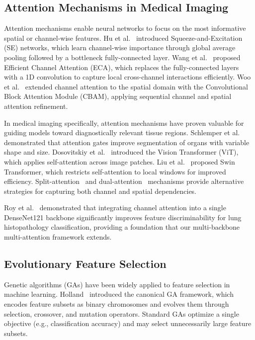 \documentclass{article}
\begin{document}
\subsection{Attention Mechanisms in Medical Imaging}

Attention mechanisms enable neural networks to focus on the most informative spatial or channel-wise features. Hu et al.~\cite{hu2018squeeze} introduced Squeeze-and-Excitation (SE) networks, which learn channel-wise importance through global average pooling followed by a bottleneck fully-connected layer. Wang et al.~\cite{wang2020eca} proposed Efficient Channel Attention (ECA), which replaces the fully-connected layers with a 1D convolution to capture local cross-channel interactions efficiently. Woo et al.~\cite{woo2018cbam} extended channel attention to the spatial domain with the Convolutional Block Attention Module (CBAM), applying sequential channel and spatial attention refinement.

In medical imaging specifically, attention mechanisms have proven valuable for guiding models toward diagnostically relevant tissue regions. Schlemper et al.~\cite{schlemper2019attention} demonstrated that attention gates improve segmentation of organs with variable shape and size. Dosovitskiy et al.~\cite{dosovitskiy2020image} introduced the Vision Transformer (ViT), which applies self-attention across image patches. Liu et al.~\cite{liu2021swin} proposed Swin Transformer, which restricts self-attention to local windows for improved efficiency. Split-attention~\cite{zhang2022resnest} and dual-attention~\cite{fu2019dual} mechanisms provide alternative strategies for capturing both channel and spatial dependencies.

Roy et al.~\cite{roy2025grouping} demonstrated that integrating channel attention into a single DenseNet121 backbone significantly improves feature discriminability for lung histopathology classification, providing a foundation that our multi-backbone multi-attention framework extends.

\subsection{Evolutionary Feature Selection}

Genetic algorithms (GAs) have been widely applied to feature selection in machine learning. Holland~\cite{holland1992adaptation} introduced the canonical GA framework, which encodes feature subsets as binary chromosomes and evolves them through selection, crossover, and mutation operators. Standard GAs optimize a single objective (e.g., classification accuracy) and may select unnecessarily large feature subsets.
\end{document}
